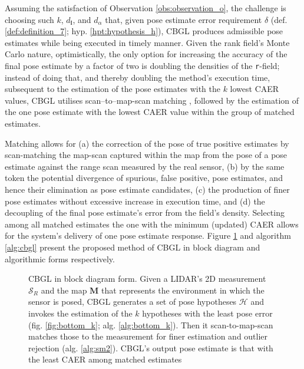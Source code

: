 Assuming the satisfaction of Observation \ref{obs:observation_o}, the challenge
is choosing such $k$, $d_{\bm{l}}$, and $d_\alpha$ that, given pose estimate
error requirement $\delta$ (def.  \ref{def:definition_7}; hyp.
\ref{hpt:hypothesis_h}), CBGL produces admissible pose estimates while being
executed in timely manner.  Given the rank field's Monte Carlo nature,
optimistically, the only option for increasing the accuracy of the final pose
estimate by a factor of two is doubling the densities of the \texttt{r}-field;
instead of doing that, and thereby doubling the method's execution time,
subsequent to the estimation of the pose estimates with the $k$ lowest CAER
values, CBGL utilises scan--to--map-scan matching
\cite{Vasiljevic2016c,Filotheou2023a}, followed by the estimation of the one
pose estimate with the lowest CAER value within the group of matched estimates.

Matching allows for (a) the correction of the pose of true positive estimates
by scan-matching the map-scan captured within the map from the pose of a pose
estimate against the range scan measured by the real sensor, (b) by the same
token the potential divergence of spurious, false positive, pose estimates, and
hence their elimination as pose estimate candidates, (c) the production of
finer pose estimates without excessive increase in execution time, and (d) the
decoupling of the final pose estimate's error from the field's density.
Selecting among all matched estimates the one with the minimum (updated) CAER
allows for the system's delivery of one pose estimate response.  Figure
\ref{fig:cbgl} and algorithm \ref{alg:cbgl} present the proposed method of CBGL
in block diagram and algorithmic forms respectively.

\begin{figure}[]\centering
  
  \caption{\small CBGL in block diagram form. Given a LIDAR's 2D measurement
           $\mathcal{S}_R$ and the map $\bm{M}$ that represents the environment
           in which the sensor is posed, CBGL generates a set of pose hypotheses
           $\mathcal{H}$ and invokes the estimation of the $k$ hypotheses with
           the least pose error (fig. \ref{fig:bottom_k}; alg.
           \ref{alg:bottom_k}). Then it scan-to-map-scan matches those to the
           measurement for finer estimation and outlier rejection (alg.
           \ref{alg:sm2}). CBGL's output pose estimate is that with the least
           CAER among matched estimates}
  \label{fig:cbgl}
\end{figure}

